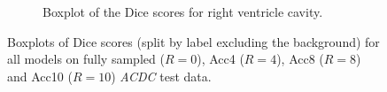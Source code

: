 \documentclass[english,version-2022-01]{uzl-thesis} %
\begin{document}
\begin{figure}[h]
\begin{subfigure}{0.8\textwidth}
    		\caption{Boxplot of the Dice scores for right ventricle cavity.} %
    		\label{fig:Boxplot_DiceScores_RV-Cavity}
	\end{subfigure}
	\caption{Boxplots of Dice scores (split by label excluding the background) for all models on fully sampled ($R=0$), Acc4 ($R=4$), Acc8 ($R=8$) and Acc10 ($R=10$) \emph{ACDC} test data.}
	\label{fig:Boxplots_DiceScores}
\end{figure}

\end{document}

